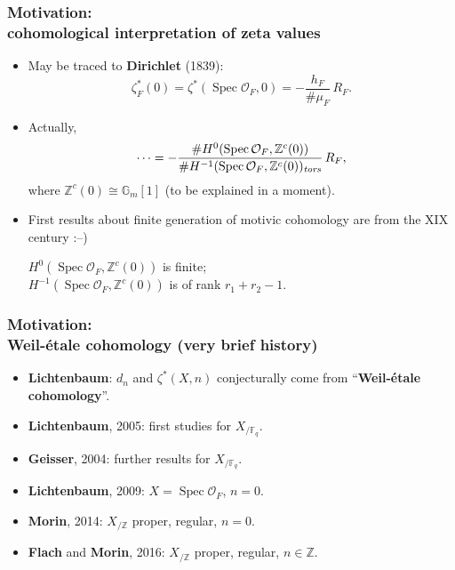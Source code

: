\documentclass[handout]{beamer}
\newcommand{\personality}[1]{{\bf #1}}
\newcommand{\ZZ}{\mathbb{Z}}
\newcommand{\FF}{\mathbb{F}}
\newcommand{\isom}{\cong}
\renewcommand{\O}{\mathcal{O}}
\DeclareMathOperator{\Spec}{Spec}
\newcommand{\term}{\textbf}
\begin{document}
\begin{frame}
  \frametitle{Motivation:\\
    cohomological interpretation of zeta values}

  \begin{itemize}
  \item<2-> May be traced to \personality{Dirichlet} (1839):
    $$\zeta_F^* (0) = \zeta^* (\Spec \O_F, 0) = -\frac{h_F}{\#\mu_F}\,R_F.$$

  \item<3-> Actually,
    $$\cdots = -\frac{\# H^0 (\Spec \O_F, \ZZ^c (0))}{\# H^{-1} (\Spec \O_F, \ZZ^c (0))_\text{\it tors}}\,R_F,$$
    where $\ZZ^c (0) \isom \mathbb{G}_m [1]$ (to be explained in a moment).

  \item<4->[*] First results about finite generation of motivic cohomology are
    from the XIX century :--)

    $H^0 (\Spec \O_F, \ZZ^c (0))$ is finite;\\
    $H^{-1} (\Spec \O_F, \ZZ^c (0))$ is of rank $r_1 + r_2 - 1.$
  \end{itemize}
\end{frame}


\begin{frame}
  \frametitle{Motivation:\\
    Weil-étale cohomology (very brief history)}

  \begin{itemize}
  \item<2-> \personality{Lichtenbaum}: $d_n$ and $\zeta^* (X,n)$ conjecturally
    come from ``\term{Weil-étale cohomology}''.

  \item<3-> \personality{Lichtenbaum}, 2005: first studies for $X_{/\FF_q}$.

  \item<4-> \personality{Geisser}, 2004: further results for $X_{/\FF_q}$.

  \item<5-> \personality{Lichtenbaum}, 2009: $X = \Spec \O_F$, $n = 0$.

  \item<6-> \personality{Morin}, 2014: $X_{/\ZZ}$ proper, regular, $n = 0$.

  \item<7-> \personality{Flach} and \personality{Morin}, 2016: $X_{/\ZZ}$
    proper, regular, $n \in \ZZ$.
  \end{itemize}
\end{frame}
\end{document}
